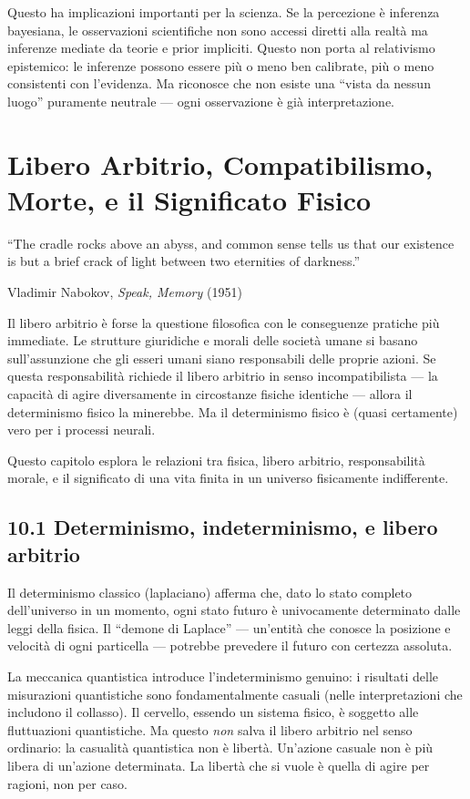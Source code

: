 \documentclass[11.5pt,a4paper,openany]{book}
\theoremstyle{remark}
\begin{document}
Questo ha implicazioni importanti per la scienza. Se la percezione è inferenza bayesiana, le osservazioni scientifiche non sono accessi diretti alla realtà ma inferenze mediate da teorie e prior impliciti. Questo non porta al relativismo epistemico: le inferenze possono essere più o meno ben calibrate, più o meno consistenti con l'evidenza. Ma riconosce che non esiste una ``vista da nessun luogo'' puramente neutrale --- ogni osservazione è già interpretazione.

\chapter{Libero Arbitrio, Compatibilismo, Morte, e il Significato Fisico}

\epigraph{``The cradle rocks above an abyss, and common sense tells us that our existence is but a brief crack of light between two eternities of darkness.''}{Vladimir Nabokov, \textit{Speak, Memory} (1951)}

Il libero arbitrio è forse la questione filosofica con le conseguenze pratiche più immediate. Le strutture giuridiche e morali delle società umane si basano sull'assunzione che gli esseri umani siano responsabili delle proprie azioni. Se questa responsabilità richiede il libero arbitrio in senso incompatibilista --- la capacità di agire diversamente in circostanze fisiche identiche --- allora il determinismo fisico la minerebbe. Ma il determinismo fisico è (quasi certamente) vero per i processi neurali.

Questo capitolo esplora le relazioni tra fisica, libero arbitrio, responsabilità morale, e il significato di una vita finita in un universo fisicamente indifferente.

\section{10.1 Determinismo, indeterminismo, e libero arbitrio}

Il determinismo classico (laplaciano) afferma che, dato lo stato completo dell'universo in un momento, ogni stato futuro è univocamente determinato dalle leggi della fisica. Il ``demone di Laplace'' --- un'entità che conosce la posizione e velocità di ogni particella --- potrebbe prevedere il futuro con certezza assoluta.

La meccanica quantistica introduce l'indeterminismo genuino: i risultati delle misurazioni quantistiche sono fondamentalmente casuali (nelle interpretazioni che includono il collasso). Il cervello, essendo un sistema fisico, è soggetto alle fluttuazioni quantistiche. Ma questo \textit{non} salva il libero arbitrio nel senso ordinario: la casualità quantistica non è libertà. Un'azione casuale non è più libera di un'azione determinata. La libertà che si vuole è quella di agire per ragioni, non per caso.
\end{document}
